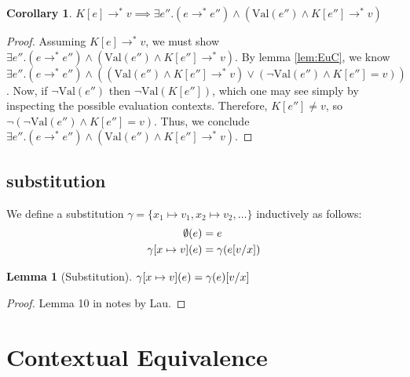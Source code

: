 \documentclass[twoside,11pt,openright]{report}
\newtheorem{corollary}{Corollary}[theorem]
\newtheorem{lemma}[theorem]{Lemma}
\theoremstyle{definition}
\newcommand{\var}{x}
\newcommand{\expr}{e}
\newcommand{\val}{v}
\newcommand{\elctx}{K}
\newcommand{\subst}[3]{#1{\left[#3 \middle/ #2 \right]}}
\newcommand{\stepS}{\rightarrow^*}
\newcommand{\Val}[1]{\mathrm{Val}(#1)}
\newcommand{\map}[2]{#1 \mapsto #2}
\begin{document}
\begin{corollary}\label{cor:EuC_val}
  $\elctx[\expr] \stepS \val \implies \exists \expr'' . (\expr \stepS \expr'') \land (\Val{\expr''} \land \elctx[\expr''] \stepS \val)$
\end{corollary}
\begin{proof}
  Assuming $\elctx[\expr] \stepS \val$, we must show $\exists \expr'' . (\expr \stepS \expr'') \land (\Val{\expr''} \land \elctx[\expr''] \stepS \val)$.
  By lemma \ref*{lem:EuC}, we know $\exists \expr'' . (\expr \stepS \expr'') \land ((\Val{\expr''} \land \elctx[\expr''] \stepS \val) \lor
  (\neg \Val{\expr''} \land \elctx[\expr''] = \val))$. Now, if $\neg \Val{\expr''}$ then $\neg \Val{\elctx[\expr'']}$, which one may see simply by inspecting the possible evaluation contexts. Therefore, $\elctx[\expr''] \neq \val$, so $\neg(\neg \Val{\expr''} \land \elctx[\expr''] = \val)$. Thus, we conclude $\exists \expr'' . (\expr \stepS \expr'') \land (\Val{\expr''} \land \elctx[\expr''] \stepS \val)$.
\end{proof}

\section{substitution}
We define a substitution $\gamma = \{\map{\var_1}{\val_1}, \map{\var_2}{\val_2}, \dots\}$ inductively as follows:
\begin{align*}
  \emptyset(\expr) &= \expr\\
  \gamma[\map{\var}{\val}](\expr) &= \gamma(\subst{\expr}{\var}{\val})
\end{align*}

\begin{lemma}[Substitution]\label{lem:sub}
  $\gamma[\map{\var}{\val}](\expr) = \subst{\gamma(\expr)}{\var}{\val}$
\end{lemma}
\begin{proof}
  Lemma 10 in notes by Lau.
\end{proof}


\chapter{Contextual Equivalence}
\label{ch:CE}
\end{document}
